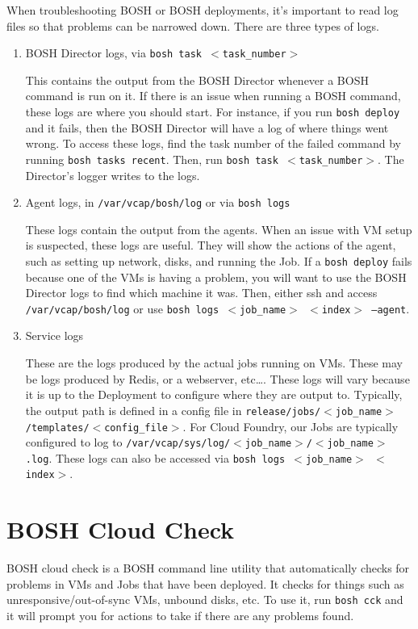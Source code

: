 When troubleshooting BOSH or BOSH deployments, it's important to read log files so that problems can be narrowed down. There are three types of logs.

\begin{enumerate}
\item BOSH Director logs, via \texttt{bosh task $<$task\_number$>$}

This contains the output from the BOSH Director whenever a BOSH command is run on it. If there is an issue when running a BOSH command, these logs are where you should start. For instance, if you run \texttt{bosh deploy} and it fails, then the BOSH Director will have a log of where things went wrong. To access these logs, find the task number of the failed command by running \texttt{bosh tasks recent}. Then, run \texttt{bosh task $<$task\_number$>$}. The Director's logger writes to the logs.

\item Agent logs, in \texttt{\slash var\slash vcap\slash bosh\slash log} or via \texttt{bosh logs}

These logs contain the output from the agents. When an issue with VM setup is suspected, these logs are useful. They will show the actions of the agent, such as setting up network, disks, and running the Job. If a \texttt{bosh deploy} fails because one of the VMs is having a problem, you will want to use the BOSH Director logs to find which machine it was. Then, either ssh and access \texttt{\slash var\slash vcap\slash bosh\slash log} or use \texttt{bosh logs $<$job\_name$>$ $<$index$>$ --agent}.

\item Service logs

These are the logs produced by the actual jobs running on VMs. These may be logs produced by Redis, or a webserver, etc…. These logs will vary because it is up to the Deployment to configure where they are output to. Typically, the output path is defined in a config file in \texttt{release\slash jobs\slash $<$job\_name$>$\slash templates\slash $<$config\_file$>$}. For Cloud Foundry, our Jobs are typically configured to log to \texttt{\slash var\slash vcap\slash sys\slash log\slash $<$job\_name$>$\slash $<$job\_name$>$.log}. These logs can also be accessed via \texttt{bosh logs $<$job\_name$>$ $<$index$>$}.

\end{enumerate}

\section{BOSH Cloud Check}
\label{boshcloudcheck}

BOSH cloud check is a BOSH command line utility that automatically checks for problems in VMs and Jobs that have been deployed. It checks for things such as unresponsive\slash out-of-sync VMs, unbound disks, etc. To use it, run \texttt{bosh cck} and it will prompt you for actions to take if there are any problems found.





